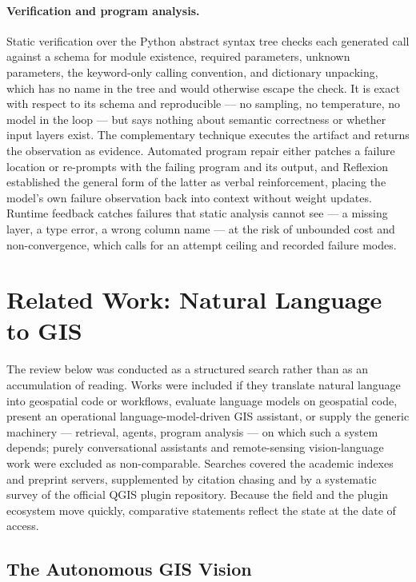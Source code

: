 \paragraph{Verification and program analysis.} Static verification over the
Python abstract syntax tree \cite{astech} checks each generated call against a
schema for module existence, required parameters, unknown parameters, the
keyword-only calling convention, and dictionary unpacking, which has no name in
the tree and would otherwise escape the check. It is exact with respect to its
schema and reproducible --- no sampling, no temperature, no model in the loop
--- but says nothing about semantic correctness or whether input layers exist.
The complementary technique executes the artifact and returns the observation
as evidence. Automated program repair either patches a failure location
\cite{gazzola2019automatic} or re-prompts with the failing program and its
output, and Reflexion \cite{shinn2023reflexion} established the general form of
the latter as verbal reinforcement, placing the model's own failure observation
back into context without weight updates. Runtime feedback catches failures that
static analysis cannot see --- a missing layer, a type error, a wrong column
name --- at the risk of unbounded cost and non-convergence, which calls for an
attempt ceiling and recorded failure modes.

\section{Related Work: Natural Language to GIS}
\label{sec:bg:related}

The review below was conducted as a structured search rather than as an
accumulation of reading. Works were included if they translate natural language
into geospatial code or workflows, evaluate language models on geospatial code,
present an operational language-model-driven GIS assistant, or supply the
generic machinery --- retrieval, agents, program analysis --- on which such a
system depends; purely conversational assistants and remote-sensing
vision-language work were excluded as non-comparable. Searches covered the
academic indexes and preprint servers, supplemented by citation chasing and by
a systematic survey of the official QGIS plugin repository. Because the field
and the plugin ecosystem move quickly, comparative statements reflect the state
at the date of access.

\subsection{The Autonomous GIS Vision}

